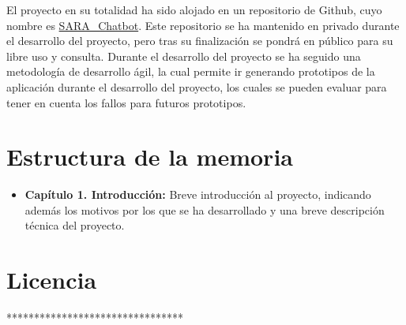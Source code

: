 El proyecto en su totalidad ha sido alojado en un repositorio de \gls{Github}, cuyo nombre es \href{https://github.com/Mario-Carmona/SARA_Chatbot}{SARA\_Chatbot}. Este repositorio se ha mantenido en privado durante el desarrollo del proyecto, pero tras su finalización se pondrá en público para su libre uso y consulta. Durante el desarrollo del proyecto se ha seguido una metodología de desarrollo ágil, la cual permite ir generando prototipos de la aplicación durante el desarrollo del proyecto, los cuales se pueden evaluar para tener en cuenta los fallos para futuros prototipos.

\section{Estructura de la memoria}

\begin{itemize}
\item \textbf{Capítulo 1. Introducción:} Breve introducción al proyecto, indicando además los motivos por los que se ha desarrollado y una breve descripción técnica del proyecto.
\end{itemize}

\section{Licencia}

********************************
